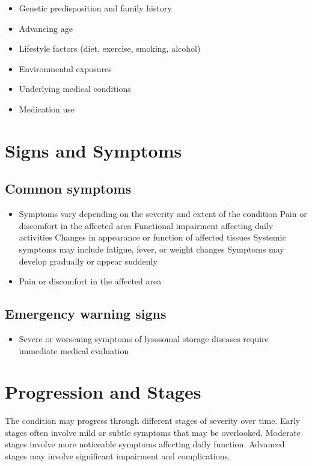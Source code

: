 \begin{itemize}[noitemsep]
  \item Genetic predisposition and family history
  \item Advancing age
  \item Lifestyle factors (diet, exercise, smoking, alcohol)
  \item Environmental exposures
  \item Underlying medical conditions
  \item Medication use
\end{itemize}
\section{Signs and Symptoms}

\subsection{Common symptoms}
\begin{itemize}[noitemsep]
  \item Symptoms vary depending on the severity and extent of the condition Pain or discomfort in the affected area Functional impairment affecting daily activities Changes in appearance or function of affected tissues Systemic symptoms may include fatigue, fever, or weight changes Symptoms may develop gradually or appear suddenly
  \item Pain or discomfort in the affected area
  \end{itemize}

\subsection{Emergency warning signs}
\begin{itemize}[noitemsep]
  \item Severe or worsening symptoms of lysosomal storage diseases require immediate medical evaluation
\end{itemize}
\section{Progression and Stages}
The condition may progress through different stages of severity over time. Early stages often involve mild or subtle symptoms that may be overlooked. Moderate stages involve more noticeable symptoms affecting daily function. Advanced stages may involve significant impairment and complications.

